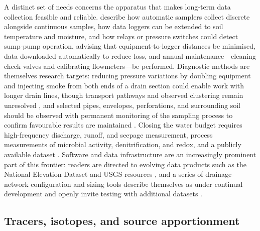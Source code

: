 \documentclass[11pt]{article}
\begin{document}
A distinct set of needs concerns the apparatus that makes long-term data
collection feasible and reliable. \textcite{Kanwar1999} describe how
automatic samplers collect discrete alongside continuous samples, how data
loggers can be extended to soil temperature and moisture, and how relays or
pressure switches could detect sump-pump operation, advising that
equipment-to-logger distances be minimised, data downloaded automatically to
reduce loss, and annual maintenance---cleaning check valves and calibrating
flowmeters---be performed. Diagnostic methods are themselves research
targets: reducing pressure variations by doubling equipment and injecting
smoke from both ends of a drain section could enable work with longer drain
lines, though transport pathways and observed clustering remain unresolved
\parencite{Petersen2012}, and selected pipes, envelopes, perforations, and
surrounding soil should be observed with permanent monitoring of the
sampling process to confirm favourable results are maintained
\parencite{MartínezBeltrán2007}. Closing the water budget requires
high-frequency discharge, runoff, and seepage measurement, process
measurements of microbial activity, denitrification, and redox, and a
publicly available dataset \parencite{Frankenberger2024}. Software and data
infrastructure are an increasingly prominent part of this frontier:
readers are directed to evolving data products such as the National
Elevation Dataset and USGS resources \parencite{Shedekar2018}, and a series
of drainage-network configuration and sizing tools describe themselves as
under continual development and openly invite testing with additional
datasets \parencite{Falasy2025,Falasy2025b,Falasy2024}.

\subsection{Tracers, isotopes, and source apportionment}
\end{document}
